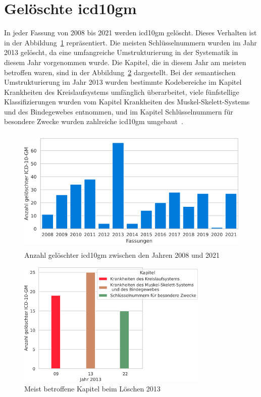 \section{Gelöschte \acs{icd10gm}} \label{sec:deletedicd}

In jeder Fassung von 2008 bis 2021 werden \ac{icd10gm} gelöscht. Dieses Verhalten ist in der Abbildung~\ref{fig:newdeleteoldicdyear} repräsentiert. Die meisten Schlüsselnummern wurden im Jahr 2013 gelöscht, da eine umfangreiche Umstrukturierung in der Systematik in diesem Jahr vorgenommen wurde. Die Kapitel, die in diesem Jahr am meisten betroffen waren, sind in der Abbildung~\ref{fig:kap13} dargestellt. Bei der semantischen Umstrukturierung im Jahr 2013 wurden bestimmte Kodebereiche im Kapitel \textsf{Krankheiten des Kreislaufsystems} umfänglich überarbeitet, viele fünfstellige Klassifizierungen wurden vom Kapitel \textsf{Krankheiten des Muskel-Skelett-Systems und des Bindegewebes} entnommen, und im Kapitel \textsf{Schlüsselnummern für besondere Zwecke} wurden zahlreiche \ac{icd10gm} umgebaut~\cite{dele13}.

\begin{figure}[ht]
	\centering
	\includegraphics[height=6cm]{figures/neuVersionDelete}
	\caption[Gelöschte \acs{icd10gm} pro Jahr]{Anzahl gelöschter \acs{icd10gm} zwischen den Jahren 2008 und 2021}
	\label{fig:newdeleteoldicdyear}
\end{figure} 

\clearpage

\begin{figure}[ht]
	\centering
	\includegraphics[height=6cm]{figures/kaptnr13}
	\caption{Meist betroffene Kapitel beim Löschen 2013}
	\label{fig:kap13}
\end{figure}


